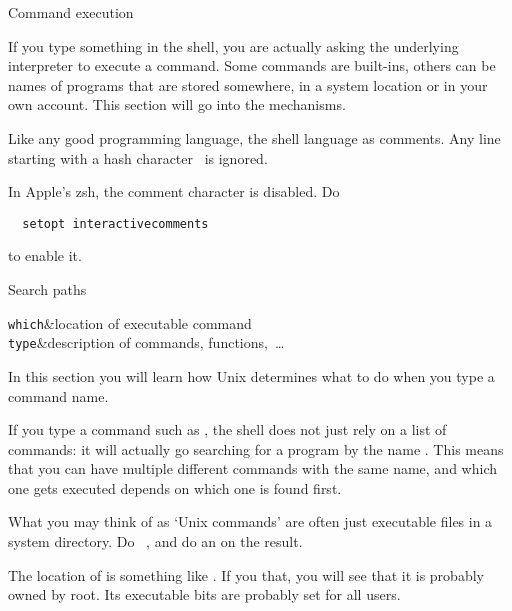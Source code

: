  {Command execution}

If you type something in the shell,
you are actually asking the underlying interpreter to execute a command.
Some commands are built-ins, others can be names of programs that
are stored somewhere, in a system location or in your own account.
This section will go into the mechanisms.

\begin{remark}
  Like any good programming language, the shell language as comments.
  Any line starting with a hash character~\n{#} is ignored.
\end{remark}
\begin{zshnote}
  In Apple's zsh, the comment character is disabled. Do
\begin{verbatim}
  setopt interactivecomments
\end{verbatim}
to enable it.
\end{zshnote}

 {Search paths}
\label{sec:PATH}

\begin{stufflearned}
  \lstinline+which+&location of executable command\\
  \lstinline+type+&description of commands, functions,~\ldots\\
\end{stufflearned}

\begin{purpose}
  In this section you will learn how Unix determines what to do when
  you type a command name.
\end{purpose}

If you type a command such as , the shell does not just rely on
a list of commands: it will actually go searching for a program by the
name . This means that you can have multiple different commands
with the same name, and which one gets executed depends on which one
is found first.

\begin{exercise}
  What you may think of as `Unix commands' are often just executable
  files in a system directory. Do ~, and do
  an  on the result.
\end{exercise}
\begin{outcome}
  The location of  is something like . If you
     that, you will see that it is probably owned by root. Its
    executable bits are probably set for all users.
\end{outcome}


